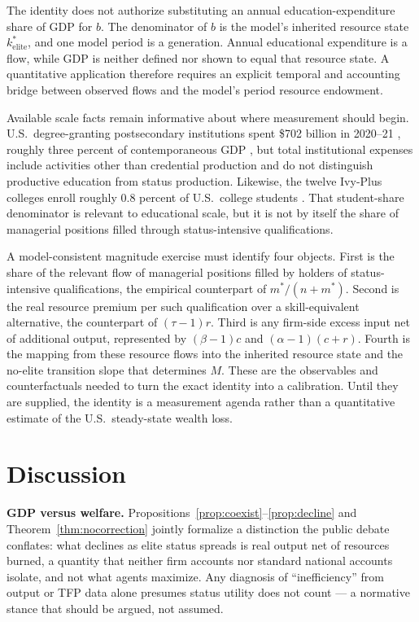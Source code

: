 \documentclass[12pt,letterpaper]{article}
\theoremstyle{definition}
\begin{document}
The identity does not authorize substituting an annual education-expenditure share of GDP for $b$.
The denominator of $b$ is the model's inherited resource state $k^\ast_{\mathrm{elite}}$, and one model period is a generation.
Annual educational expenditure is a flow, while GDP is neither defined nor shown to equal that resource state.
A quantitative application therefore requires an explicit temporal and accounting bridge between observed flows and the model's period resource endowment.

Available scale facts remain informative about where measurement should begin.
U.S.\ degree-granting postsecondary institutions spent \$702 billion in 2020--21 \citep{nces2023expenses}, roughly three percent of contemporaneous GDP \citep{bea2022gdp}, but total institutional expenses include activities other than credential production and do not distinguish productive education from status production.
Likewise, the twelve Ivy-Plus colleges enroll roughly $0.8$ percent of U.S.\ college students \citep{chettydemingfriedman2026}.
That student-share denominator is relevant to educational scale, but it is not by itself the share of managerial positions filled through status-intensive qualifications.

A model-consistent magnitude exercise must identify four objects.
First is the share of the relevant flow of managerial positions filled by holders of status-intensive qualifications, the empirical counterpart of $m^\ast/(n+m^\ast)$.
Second is the real resource premium per such qualification over a skill-equivalent alternative, the counterpart of $(\tau-1)r$.
Third is any firm-side excess input net of additional output, represented by $(\beta-1)c$ and $(\alpha-1)(c+r)$.
Fourth is the mapping from these resource flows into the inherited resource state and the no-elite transition slope that determines $M$.
These are the observables and counterfactuals needed to turn the exact identity into a calibration.
Until they are supplied, the identity is a measurement agenda rather than a quantitative estimate of the U.S.\ steady-state wealth loss.

\section{Discussion}\label{sec:discussion}

\textbf{GDP versus welfare.}
Propositions~\ref{prop:coexist}--\ref{prop:decline} and Theorem~\ref{thm:nocorrection} jointly formalize a distinction the public debate conflates: what declines as elite status spreads is real output net of resources burned, a quantity that neither firm accounts nor standard national accounts isolate, and not what agents maximize.
Any diagnosis of ``inefficiency'' from output or TFP data alone presumes status utility does not count --- a normative stance that should be argued, not assumed.
\end{document}
